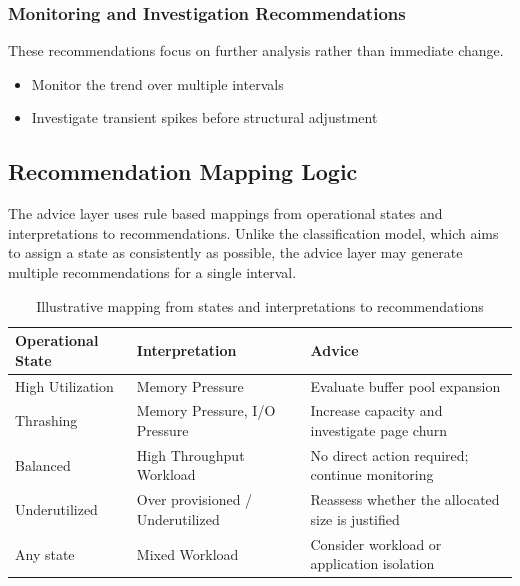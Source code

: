 \subsubsection{Monitoring and Investigation Recommendations}

These recommendations focus on further analysis rather than immediate change.

\begin{itemize}
    \item Monitor the trend over multiple intervals
    \item Investigate transient spikes before structural adjustment
\end{itemize}

\subsection{Recommendation Mapping Logic}

The advice layer uses rule based mappings from operational states and interpretations to recommendations. Unlike the classification model, which aims to assign a state as consistently as possible, the advice layer may generate multiple recommendations for a single interval.

\begin{table}[h]
    \centering
    \renewcommand{\arraystretch}{1.3}
    \begin{tabular}{|p{3.2cm}|p{4.2cm}|p{5.6cm}|}
        \hline
        \textbf{Operational State} & \textbf{Interpretation} & \textbf{Advice} \\
        \hline
        High Utilization & Memory Pressure & Evaluate buffer pool expansion \\
        \hline
        Thrashing & Memory Pressure, I/O Pressure & Increase capacity and investigate page churn \\
        \hline
        Balanced & High Throughput Workload & No direct action required; continue monitoring \\
        \hline
        Underutilized & Over provisioned / Underutilized & Reassess whether the allocated size is justified \\
        \hline
        Any state & Mixed Workload & Consider workload or application isolation \\
        \hline
    \end{tabular}
    \caption{Illustrative mapping from states and interpretations to recommendations}
\end{table}


